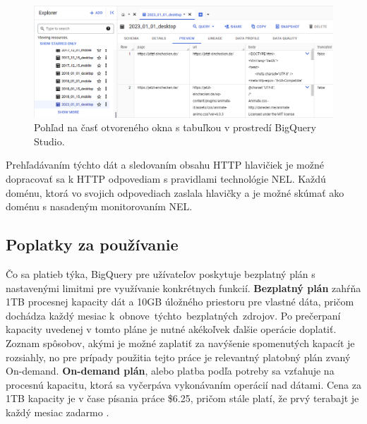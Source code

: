 \begin{figure}[htb]
\begin{center}
 \includegraphics[scale=0.53]{obrazky-figures/bigquery_response_bodies.png}    
 \caption{\centering Pohľad na časť otvoreného okna s tabuľkou  v prostredí BigQuery Studio.}
 \label{img:bigquery-example-table}
\end{center}
\end{figure}

Prehľadávaním týchto dát a sledovaním obsahu HTTP hlavičiek je možné dopracovať sa k HTTP odpovediam s pravidlami technológie NEL.
Každú doménu, ktorá vo svojich odpovediach zaslala hlavičky  a  je možné skúmať ako doménu s nasadeným monitorovaním NEL.

\subsection{Poplatky za používanie}

Čo sa platieb týka, BigQuery pre užívateľov poskytuje bezplatný plán s nastavenými limitmi pre využívanie konkrétnych funkcií.
\textbf{Bezplatný plán} zahŕňa 1TB procesnej kapacity dát a 10GB úložného priestoru pre vlastné dáta, pričom dochádza každý mesiac \mbox{k obnove týchto bezplatných zdrojov}.
Po prečerpaní kapacity uvedenej v tomto pláne je nutné akékoľvek ďalšie operácie doplatiť.
Zoznam spôsobov, akými je možné zaplatiť za navýšenie spomenutých kapacít je rozsiahly, no pre prípady použitia tejto práce je relevantný platobný plán zvaný On-demand.
\textbf{On-demand plán}, alebo platba podľa potreby sa vzťahuje na procesnú kapacitu, ktorá sa vyčerpáva vykonávaním operácií nad dátami.
Cena za 1TB kapacity je v čase písania práce \$6.25, pričom stále platí, že prvý terabajt je každý mesiac zadarmo \cite{google-bq-pricing}.
